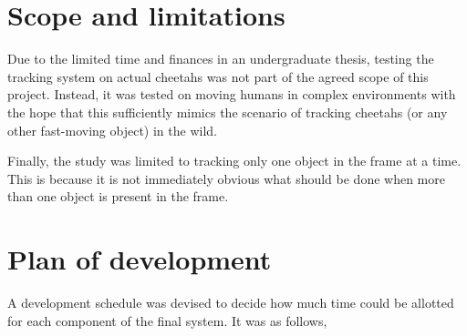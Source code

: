 \section{Scope and limitations}
Due to the limited time and finances in an undergraduate thesis, testing the tracking system on actual cheetahs was not part of the agreed scope of this project. Instead, it was tested on moving humans in complex environments with the hope that this sufficiently mimics the scenario of tracking cheetahs (or any other fast-moving object) in the wild.

Finally, the study was limited to tracking only one object in the frame at a time. This is because it is not immediately obvious what should be done when more than one object is present in the frame.


\section{Plan of development}
A development schedule was devised to decide how much time could be allotted for each component of the final system. It was as follows,

